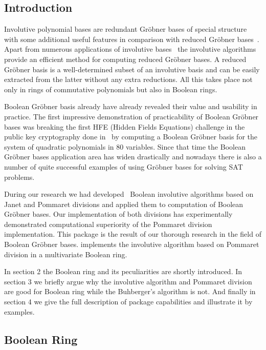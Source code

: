 

\subsection{Introduction}

Involutive polynomial bases are redundant Gr\"obner bases of special structure with some additional useful features in comparison
with reduced Gr\"obner bases~\cite{Gerdt:98}. Apart from numerous applications of involutive bases~\cite{Seiler:2010} the
involutive algorithms~\cite{Gerdt:2005} provide an efficient method for computing reduced Gr\"obner bases. A reduced Gr\"obner basis
is a well-determined subset of an involutive basis and can be easily extracted from the latter without any extra reductions.
All this takes place not only in rings of commutative polynomials but also in Boolean rings.

Boolean Gr\"obner basis already have already revealed their value and usability in  practice. The first impressive demonstration
of practicability of Boolean Gr\"obner bases was breaking the first HFE (Hidden Fields Equations) challenge in the public
key cryptography done in~\cite{Faugere:2003} by computing a Boolean Gr\"obner basis for the system of quadratic
polynomials in 80 variables. Since that time the Boolean Gr\"obner bases application area has widen drastically and nowadays there
is also a number of quite successful examples of using Gr\"obner bases for solving SAT problems.

During our research we had developed~\cite{Gerdt:2008, Gerdt:2008a, Gerdt:2010} Boolean involutive algorithms based on Janet and Pommaret
divisions and applied them to computation of Boolean Gr\"obner bases. Our implementation of both divisions has experimentally
demonstrated computational superiority of the Pommaret division implementation. This package  is the result
of our thorough research in the field of Boolean Gr\"obner bases.  implements the involutive algorithm based on Pommaret
division in a multivariate Boolean ring.

In section 2 the Boolean ring and its peculiarities are shortly introduced. In section 3 we briefly argue
why the involutive algorithm and Pommaret division are good for Boolean ring while the Buhberger's algorithm is not.
And finally in section 4 we give the full description of  package capabilities and illustrate it by examples.

\subsection{Boolean Ring}

